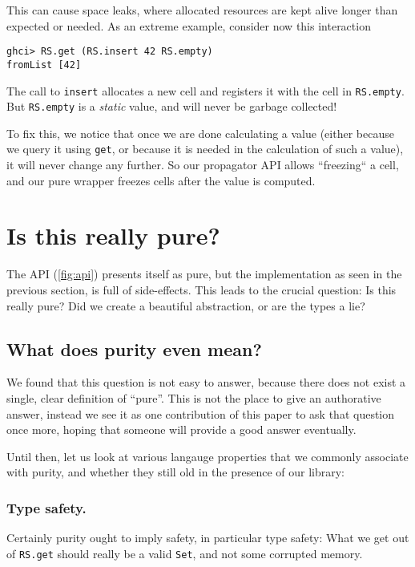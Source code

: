 \documentclass[manuscript,screen,acmsmall]{acmart}
\begin{document}
This can cause space leaks, where allocated resources are kept alive longer than expected or needed. As an extreme example, consider now this interaction
\begin{verbatim}
ghci> RS.get (RS.insert 42 RS.empty)
fromList [42]
\end{verbatim}
The call to \verb|insert| allocates a new cell and registers it with the cell in \verb|RS.empty|. But \verb|RS.empty| is a \emph{static} value, and will never be garbage collected!

To fix this, we notice that once we are done calculating a value (either because we query it using \verb|get|, or because it is needed in the calculation of such a value), it will never change any further. So our propagator API allows “freezing“ a cell, and our pure wrapper freezes cells after the value is computed.

\section{Is this really pure?}\label{sec:pure}

The API (\cref{fig:api}) presents itself as pure, but the implementation as seen in the previous section, is full of side-effects. This leads to the crucial question: Is this really pure? Did we create a beautiful abstraction, or are the types a lie?

\subsection{What does purity even mean?}

We found that this question is not easy to answer, because there does not exist a single, clear definition of “pure”. This is not the place to give an authorative answer, instead we see it as one contribution of this paper to ask that question once more, hoping that someone will provide a good answer eventually.

Until then, let us look at various langauge properties that we commonly associate with purity, and whether they still old in the presence of our library:

\subsubsection{Type safety.}

Certainly purity ought to imply safety, in particular type safety: What we get out of \verb|RS.get| should really be a valid \verb|Set|, and not some corrupted memory.
\end{document}
